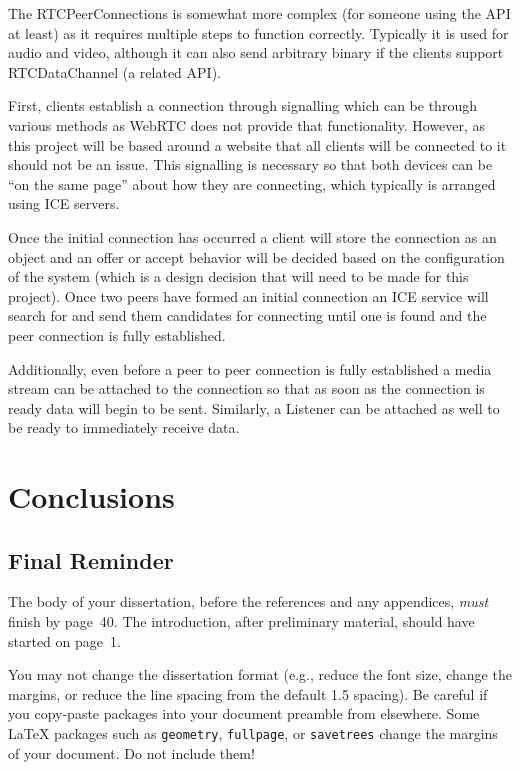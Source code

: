 \documentclass[bsc,frontabs,singlespacing,parskip,deptreport]{infthesis}
\begin{document}
The RTCPeerConnections is somewhat more complex (for someone using the API at least) as it requires multiple steps to function correctly.  Typically it is used for audio and video, although it can also send arbitrary binary if the clients support RTCDataChannel (a related API).

First, clients establish a connection through signalling which can be through various methods as WebRTC does not provide that functionality.  However, as this project will be based around a website that all clients will be connected to it should not be an issue. This signalling is necessary so that both devices can be “on the same page” about how they are connecting, which typically is arranged using ICE servers.

Once the initial connection has occurred a client will store the connection as an object and an offer or accept behavior will be decided based on the configuration of the system (which is a design decision that will need to be made for this project).  Once two peers have formed an initial connection an ICE service will search for and send them candidates for connecting until one is found and the peer connection is fully established.

Additionally, even before a peer to peer connection is fully established a media stream can be attached to the connection so that as soon as the connection is ready data will begin to be sent.  Similarly, a Listener can be attached as well to be ready to immediately receive data.

\chapter{Conclusions}

\section{Final Reminder}

The body of your dissertation, before the references and any appendices,
\emph{must} finish by page~40. The introduction, after preliminary material,
should have started on page~1.

You may not change the dissertation format (e.g., reduce the font size, change
the margins, or reduce the line spacing from the default 1.5 spacing). Be
careful if you copy-paste packages into your document preamble from elsewhere.
Some \LaTeX{} packages such as \texttt{geometry}, \texttt{fullpage}, or
\texttt{savetrees} change the margins of your document. Do not include them!
\end{document}
